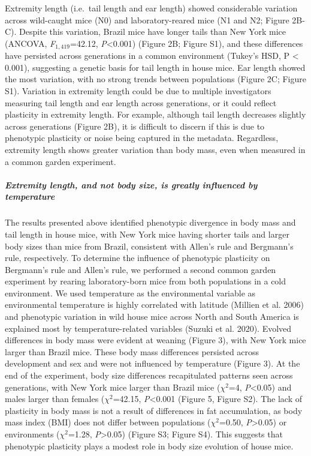 \documentclass[]{article}
\let\oldsubparagraph\subparagraph
\renewcommand{\subparagraph}[1]{\oldsubparagraph{#1}\mbox{}}
\begin{document}
Extremity length (i.e.~tail length and ear length) showed considerable
variation across wild-caught mice (N0) and laboratory-reared mice (N1
and N2; Figure 2B-C). Despite this variation, Brazil mice have longer
tails than New York mice (ANCOVA, \emph{F}\(_{1,419}\)=42.12,
\emph{P}\textless{}0.001) (Figure 2B; Figure S1), and these differences
have persisted across generations in a common environment (Tukey's HSD,
P \textless{} 0.001), suggesting a genetic basis for tail length in
house mice. Ear length showed the most variation, with no strong trends
between populations (Figure 2C; Figure S1). Variation in extremity
length could be due to multiple investigators measuring tail length and
ear length across generations, or it could reflect plasticity in
extremity length. For example, although tail length decreases slightly
across generations (Figure 2B), it is difficult to discern if this is
due to phenotypic plasticity or noise being captured in the metadata.
Regardless, extremity length shows greater variation than body mass,
even when measured in a common garden experiment.

\vspace{2.5mm}

\hypertarget{extremity-length-and-not-body-size-is-greatly-influenced-by-temperature}{%
\subparagraph{\texorpdfstring{\emph{Extremity length, and not body size,
is greatly influenced by
temperature}}{Extremity length, and not body size, is greatly influenced by temperature}}\label{extremity-length-and-not-body-size-is-greatly-influenced-by-temperature}}

The results presented above identified phenotypic divergence in body
mass and tail length in house mice, with New York mice having shorter
tails and larger body sizes than mice from Brazil, consistent with
Allen's rule and Bergmann's rule, respectively. To determine the
influence of phenotypic plasticity on Bergmann's rule and Allen's rule,
we performed a second common garden experiment by rearing
laboratory-born mice from both populations in a cold environment. We
used temperature as the environmental variable as environmental
temperature is highly correlated with latitude (Millien et al. 2006) and
phenotypic variation in wild house mice across North and South America
is explained most by temperature-related variables (Suzuki et al. 2020).
Evolved differences in body mass were evident at weaning (Figure 3),
with New York mice larger than Brazil mice. These body mass differences
persisted across development and sex and were not influenced by
temperature (Figure 3). At the end of the experiment, body size
differences recapitulated patterns seen across generations, with New
York mice larger than Brazil mice (\(\chi^2\)=4,
\emph{P}\textless{}0.05) and males larger than females
(\(\chi^2\)=42.15, \emph{P}\textless{}0.001 (Figure 5, Figure S2). The
lack of plasticity in body mass is not a result of differences in fat
accumulation, as body mass index (BMI) does not differ between
populations (\(\chi^2\)=0.50, \emph{P}\textgreater{}0.05) or
environments (\(\chi^2\)=1.28, \emph{P}\textgreater{}0.05) (Figure S3;
Figure S4). This suggests that phenotypic plasticity plays a modest role
in body size evolution of house mice.
\end{document}
